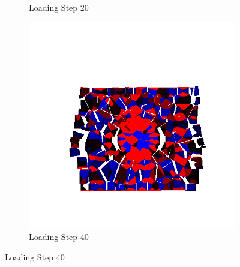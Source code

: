 \begin{figure}[ht!]
\begin{subfigure}{.33\textwidth}
      \caption{Loading Step 20}
      \end{subfigure}%
      \begin{subfigure}{.33\textwidth}
        \centering
        \includegraphics[width=1.0\linewidth]{Files/Small_DEF/IS2/DEP5-STEP(060).png}
        \caption{Loading Step 40}
      \end{subfigure}


\end{figure}
